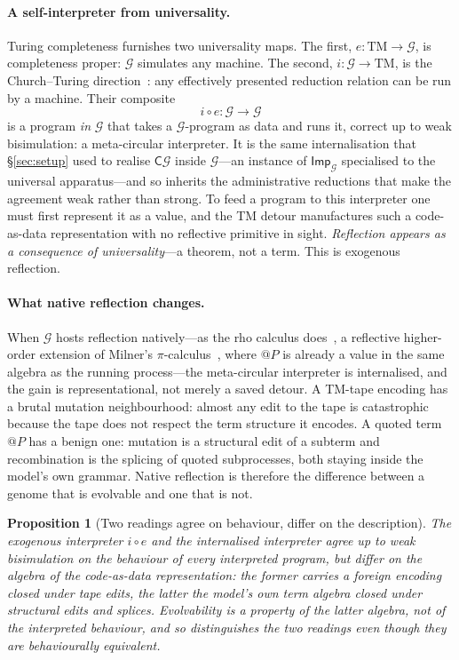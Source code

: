 \documentclass[11pt]{article}
\makeatletter
\theoremstyle{plain}
\newtheorem{proposition}{Proposition}
\theoremstyle{definition}
\theoremstyle{remark}
\newcommand{\G}{\mathcal{G}}
\newcommand{\C}{\mathsf{C}}
\newcommand{\quo}[1]{@#1}
\newcommand{\Imp}{\mathsf{Imp}}
\makeatother
\begin{document}
\paragraph{A self-interpreter from universality.}
Turing completeness furnishes two universality maps. The first,
$e:\mathrm{TM}\to\G$, is completeness proper: $\G$ simulates any machine. The
second, $i:\G\to\mathrm{TM}$, is the Church--Turing direction~\cite{turing1936}: any effectively
presented reduction relation can be run by a machine. Their composite
\[
  i\circ e:\G\longrightarrow\G
\]
is a program \emph{in} $\G$ that takes a $\G$-program as data and runs it,
correct up to weak bisimulation: a meta-circular interpreter. It is the same
internalisation that \S\ref{sec:setup} used to realise $\C\G$ inside $\G$---an
instance of $\Imp_\G$ specialised to the universal apparatus---and so inherits
the administrative reductions that make the agreement weak rather than strong.
To feed a program to
this interpreter one must first represent it as a value, and the TM detour
manufactures such a code-as-data representation with no reflective primitive in
sight. \emph{Reflection appears as a consequence of universality}---a theorem,
not a term. This is exogenous reflection.

\paragraph{What native reflection changes.}
When $\G$ hosts reflection natively---as the rho calculus does~\cite{meredith2005},
a reflective higher-order extension of Milner's $\pi$-calculus~\cite{milner1992},
where $\quo P$
is already a value in the same algebra as the running process---the
meta-circular interpreter is internalised, and the gain is representational, not
merely a saved detour. A TM-tape encoding has a brutal mutation neighbourhood:
almost any edit to the tape is catastrophic because the tape does not respect
the term structure it encodes. A quoted term $\quo P$ has a benign one: mutation
is a structural edit of a subterm and recombination is the splicing of quoted
subprocesses, both staying inside the model's own grammar. Native reflection is
therefore the difference between a genome that is evolvable and one that is not.

\begin{proposition}[Two readings agree on behaviour, differ on the description]
\label{prop:fidelity}
The exogenous interpreter $i\circ e$ and the internalised interpreter agree up
to weak bisimulation on the behaviour of every interpreted program, but differ on
the algebra of the code-as-data representation: the former carries a foreign
encoding closed under tape edits, the latter the model's own term algebra closed
under structural edits and splices. Evolvability is a property of the latter
algebra, not of the interpreted behaviour, and so distinguishes the two readings
even though they are behaviourally equivalent.
\end{proposition}
\end{document}
